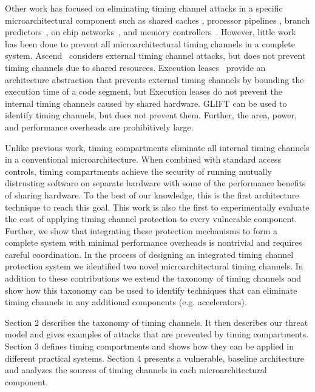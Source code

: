 Other work has focused on eliminating timing channel attacks in a specific 
microarchitectural component such as shared caches 
\cite{icache,newcache,deconstructing,cachegames}, processor pipelines 
\cite{pipelines}, branch predictors~\cite{branchpred,predictingbranch}, on chip 
networks~\cite{yaonocs}, and memory controllers~\cite{ushpca14}.
However, little work has been done to prevent all microarchitectural timing 
channels in a complete system. Ascend~\cite{ascend} considers external timing 
channel attacks, but does not prevent timing channels due to shared resources.  
Execution leases~\cite{execution_leases} provide an architecture abstraction
that prevents external timing channels by bounding the execution time of a code 
segment, but Execution leases do not prevent the internal timing channels 
caused by shared hardware. GLIFT \cite{citation_needed} can be used to identify 
timing channels, but does not prevent them. Further, the area, power, and 
performance overheads are prohibitively large.

Unlike previous work, timing compartments eliminate all internal timing 
channels in a conventional microarchitecture. When combined with standard 
access controls, timing compartments achieve the security of running mutually 
distrusting software on separate hardware with some of the performance benefits 
of sharing hardware. To the best of our knowledge, this is the first 
architecture technique to reach this goal. This work is also the first to 
experimentally evaluate the cost of applying timing channel protection to every 
vulnerable component. Further, we show that integrating these protection 
mechanisms to form a complete system with minimal performance overheads is 
nontrivial and requires careful coordination. In the process of designing an 
integrated timing channel protection system we identified two novel 
microarchitectural timing channels. In addition to these contributions we 
extend the taxonomy of timing channels and show how this taxonomy can be used 
to identify techniques that can eliminate timing channels in any additional 
components (e.g. accelerators).

Section 2 describes the taxonomy of timing channels. It then describes our 
threat model and gives examples of attacks that are prevented by timing 
compartments. Section 3 defines timing compartments and shows how they can be 
applied in different practical systems. Section 4 presents a vulnerable, 
baseline architecture and analyzes the sources of timing channels in each 
microarchitectural component.
